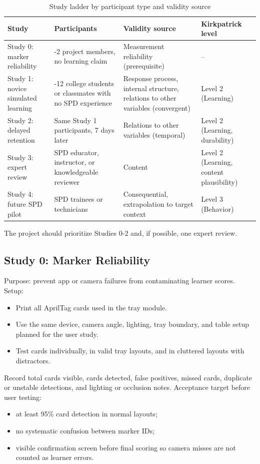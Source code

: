 \documentclass[10pt,a4paper]{article}
\begin{document}
\begin{table}[H]
\centering
\caption{Study ladder by participant type and validity source}
\label{tab:study-ladder-by-participant-type-and-claim-supported}
\small\renewcommand{\arraystretch}{1.2}\setlength{\tabcolsep}{4pt}
\begin{tabularx}{\textwidth}{|>{\raggedright\arraybackslash}X|>{\raggedright\arraybackslash}X|>{\raggedright\arraybackslash}X|>{\raggedright\arraybackslash}X|}
\hline
Study & Participants & Validity source & Kirkpatrick level \\
\hline
Study 0: marker reliability & 1-2 project members, no learning claim & Measurement reliability (prerequisite) & -- \\
\hline
Study 1: novice simulated learning & 8-12 college students or classmates with no SPD experience & Response process, internal structure, relations to other variables (convergent) & Level 2 (Learning) \\
\hline
Study 2: delayed retention & Same Study 1 participants, 7 days later & Relations to other variables (temporal) & Level 2 (Learning, durability) \\
\hline
Study 3: expert review & 1 SPD educator, instructor, or knowledgeable reviewer & Content & Level 2 (Learning, content plausibility) \\
\hline
Study 4: future SPD pilot & SPD trainees or technicians & Consequential, extrapolation to target context & Level 3 (Behavior) \\
\hline
\end{tabularx}
\end{table}
The project should prioritize Studies 0-2 and, if possible, one expert review.
\subsection{Study 0: Marker Reliability}
\label{sec:study-0}


Purpose: prevent app or camera failures from contaminating learner scores.
Setup:
\begin{itemize}
  \item Print all AprilTag cards used in the tray module.
  \item Use the same device, camera angle, lighting, tray boundary, and table setup planned for the user study.
  \item Test cards individually, in valid tray layouts, and in cluttered layouts with distractors.
\end{itemize}
Record total cards visible, cards detected, false positives, missed cards,
duplicate or unstable detections, and lighting or occlusion notes.
Acceptance target before user testing:
\begin{itemize}
  \item at least 95\% card detection in normal layouts;
  \item no systematic confusion between marker IDs;
  \item visible confirmation screen before final scoring so camera misses are not counted as learner errors.
\end{itemize}
\end{document}

